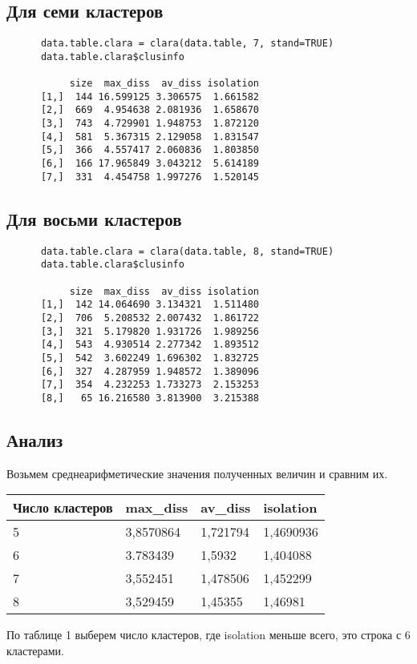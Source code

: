 \documentclass[12pt,a4paper,titlepage]{article}
\begin{document}
  \subsection {Для семи кластеров}
    \begin{lstlisting}
      data.table.clara = clara(data.table, 7, stand=TRUE)
      data.table.clara$clusinfo

           size  max_diss  av_diss isolation
      [1,]  144 16.599125 3.306575  1.661582
      [2,]  669  4.954638 2.081936  1.658670
      [3,]  743  4.729901 1.948753  1.872120
      [4,]  581  5.367315 2.129058  1.831547
      [5,]  366  4.557417 2.060836  1.803850
      [6,]  166 17.965849 3.043212  5.614189
      [7,]  331  4.454758 1.997276  1.520145
    \end{lstlisting}
  \subsection {Для восьми кластеров}
    \begin{lstlisting}
      data.table.clara = clara(data.table, 8, stand=TRUE)
      data.table.clara$clusinfo

           size  max_diss  av_diss isolation
      [1,]  142 14.064690 3.134321  1.511480
      [2,]  706  5.208532 2.007432  1.861722
      [3,]  321  5.179820 1.931726  1.989256
      [4,]  543  4.930514 2.277342  1.893512
      [5,]  542  3.602249 1.696302  1.832725
      [6,]  327  4.287959 1.948572  1.389096
      [7,]  354  4.232253 1.733273  2.153253
      [8,]   65 16.216580 3.813900  3.215388

    \end{lstlisting}
  \subsection {Анализ}
    Возьмем среднеарифметические значения полученных величин и сравним их.
    \begin{center}
      \begin{tabular}{| l | l | l | l |}
        \hline
          Число кластеров & max\_diss & av\_diss & isolation \\ \hline
          5 & 3,8570864 & 1,721794 & 1,4690936\\ \hline
          6 & 3.783439 & 1,5932 & 1,404088\\ \hline
          7 & 3,552451 & 1,478506 & 1,452299\\ \hline
          8 & 3,529459 & 1,45355 & 1,46981\\
        \hline
      \end{tabular}
    \end{center}
    По таблице 1 выберем число кластеров, где isolation меньше всего, это строка с 6 кластерами.
    
\end{document}
